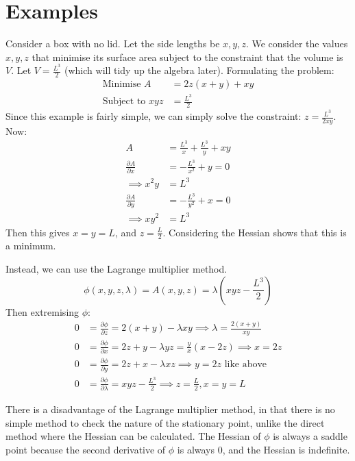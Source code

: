 \documentclass[../Main.tex]{subfiles}
\begin{document}
\section{Examples}
\begin{example}
    Consider a box with no lid. Let the side lengths be $x, y, z$. We consider the values $x, y, z$ that minimise its surface area subject to the constraint that the volume is $V$. Let $V = \frac{L^3}{2}$ (which will tidy up the algebra later). Formulating the problem:
    \begin{align*}
        \text{Minimise } A &= 2z(x + y) + xy \\
        \text{Subject to } xyz &= \frac{L^3}{2}
    \end{align*}
    Since this example is fairly simple, we can simply solve the constraint: $z = \frac{L^3}{2xy}$. Now:
    \begin{align*}
        A &= \frac{L^3}{x} + \frac{L^3}{y} + xy \\
        \frac{\partial A}{\partial x} &= -\frac{L^3}{x^2} + y = 0 \\
        \implies x^2y &= L^3 \\
        \frac{\partial A}{\partial y} &= -\frac{L^3}{y^2} + x = 0 \\
        \implies xy^2 &= L^3
    \end{align*}
    Then this gives $x = y = L$, and $z = \frac{L}{2}$. Considering the Hessian shows that this is a minimum.

    Instead, we can use the Lagrange multiplier method.
    \begin{equation*}
        \phi(x, y, z, \lambda) = A(x, y, z) = \lambda(xyz - \frac{L^3}{2})
    \end{equation*}
    Then extremising $\phi$:
    \begin{align*}
        0 &= \frac{\partial \phi}{\partial z} = 2(x + y) - \lambda xy \implies \lambda = \frac{2(x + y)}{xy} \\
        0 &= \frac{\partial \phi}{\partial x} = 2z + y - \lambda yz = \frac{y}{x}(x - 2z) \implies x = 2z \\
        0 &= \frac{\partial \phi}{\partial y} = 2z + x - \lambda xz \implies y = 2z \text{ like above} \\
        0 &= \frac{\partial \phi}{\partial \lambda} = xyz - \frac{L^3}{2} \implies z = \frac{L}{2}, x = y = L
    \end{align*}
\end{example}
There is a disadvantage of the Lagrange multiplier method, in that there is no simple method to check the nature of the stationary point, unlike the direct method where the Hessian can be calculated. The Hessian of $\phi$ is always a saddle point because the second derivative of $\phi$ is always 0, and the Hessian is indefinite.
\end{document}
